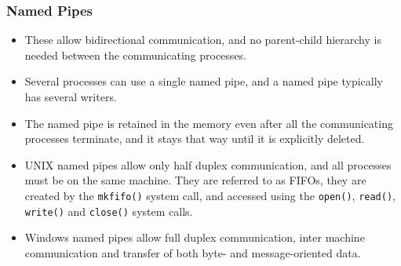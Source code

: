 \documentclass{article}
\theoremstyle{plain}
\theoremstyle{definition}
\begin{document}
\subsubsection{Named Pipes}
\begin{itemize}
    \item These allow bidirectional communication, and no parent-child hierarchy is needed between the communicating processes. 
    
    \item Several processes can use a single named pipe, and a named pipe typically has several writers. 
    
    \item The named pipe is retained in the memory even after all the communicating processes terminate, and it stays that way until it is explicitly deleted. 
    
    \item UNIX named pipes allow only half duplex communication, and all processes must be on the same machine. They are referred to as FIFOs, they are created by the \texttt{mkfifo()} system call, and accessed using the \texttt{open()}, \texttt{read()}, \texttt{write()} and \texttt{close()} system calls.
    
    \item Windows named pipes allow full duplex communication, inter machine communication and transfer of both byte- and message-oriented data. 
\end{itemize}
\end{document}
